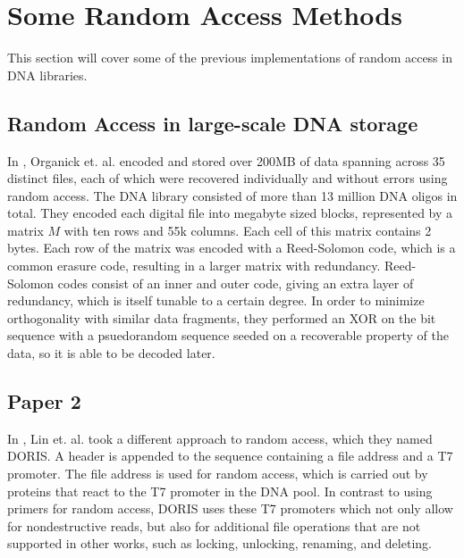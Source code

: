 \documentclass[a4paper,conference]{IEEEtran}
\begin{document}
%


\section{Some Random Access Methods}
This section will cover some of the previous implementations of random access in DNA libraries.

\subsection{Random Access in large-scale DNA storage}
In \cite{}, Organick et. al. encoded and stored over 200MB of data spanning across 35 distinct files, each of which were recovered individually and without errors using random access. The DNA library consisted of more than 13 million DNA oligos in total. They encoded each digital file into megabyte sized blocks, represented by a matrix $M$ with ten rows and 55k columns. Each cell of this matrix contains 2 bytes. Each row of the matrix was encoded with a Reed-Solomon code, which is a common erasure code, resulting in a larger matrix with redundancy. Reed-Solomon codes consist of an inner and outer code, giving an extra layer of redundancy, which is itself tunable to a certain degree. In order to minimize orthogonality with similar data fragments, they performed an XOR on the bit sequence with a psuedorandom sequence seeded on a recoverable property of the data, so it is able to be decoded later.
\subsection{Paper 2}
In \cite{}, Lin et. al. took a different approach to random access, which they named DORIS. A header is appended to the sequence containing a file address and a T7 promoter. The file address is used for random access, which is carried out by proteins that react to the T7 promoter in the DNA pool. In contrast to using primers for random access, DORIS uses these T7 promoters which not only allow for nondestructive reads, but also for additional file operations that are not supported in other works, such as locking, unlocking, renaming, and deleting. 
\end{document}
